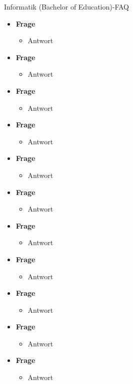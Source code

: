 \begin{LARGE}
	Informatik (Bachelor of Education)-FAQ
\end{LARGE}
\begin{large}
	\begin{itemize}
		\item \textbf{Frage} 
		\begin{itemize}
			\item Antwort
		\end{itemize}
	\item \textbf{Frage} 
	\begin{itemize}
		\item Antwort
	\end{itemize}
\item \textbf{Frage} 
\begin{itemize}
	\item Antwort
\end{itemize}
\item \textbf{Frage} 
\begin{itemize}
	\item Antwort
\end{itemize}
\item \textbf{Frage} 
\begin{itemize}
	\item Antwort
\end{itemize}
\item \textbf{Frage} 
\begin{itemize}
	\item Antwort
\end{itemize}
\item \textbf{Frage} 
\begin{itemize}
	\item Antwort
\end{itemize}
\item \textbf{Frage} 
\begin{itemize}
	\item Antwort
\end{itemize}
\item \textbf{Frage} 
\begin{itemize}
	\item Antwort
\end{itemize}
\item \textbf{Frage} 
\begin{itemize}
	\item Antwort
\end{itemize}
\item \textbf{Frage} 
\begin{itemize}
	\item Antwort
\end{itemize}
	\end{itemize}
\end{large}